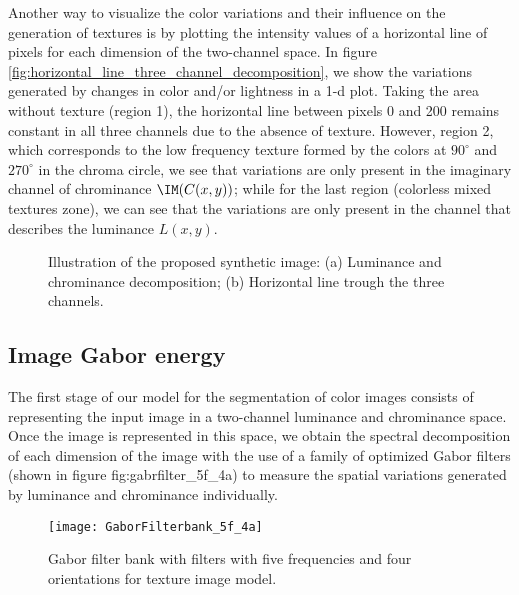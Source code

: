 Another way to visualize the color variations and their influence on the generation of textures is by plotting the intensity values of a horizontal line of pixels for each dimension of the two-channel space. In figure \ref{fig:horizontal_line_three_channel_decomposition}, we show the variations generated by changes in color and/or lightness in a 1-d plot. Taking the area without texture (region 1), the horizontal line between pixels 0 and 200 remains constant in all three channels due to the absence of texture. However, region 2, which corresponds to the low frequency texture formed by the colors at $90^\circ$ and $270^\circ$ in the chroma circle, we see that variations are only present in the imaginary channel of chrominance $\IM(C(x,y))$; while for the last region (colorless mixed textures zone), we can see that the variations are only present in the channel that describes the luminance $L(x,y)$.

\begin{figure}[!ht]
\centering
\caption{Illustration of the proposed synthetic image: (a) Luminance and chrominance decomposition; (b) Horizontal line trough the three channels.}\label{fig:three_channel_decomposition}
\end{figure}

\subsection{Image Gabor energy}
The first stage of our model for the segmentation of color images consists of representing the input image in a two-channel luminance and chrominance space. Once the image is represented in this space, we obtain the spectral decomposition of each dimension of the image with the use of a family of optimized Gabor filters (shown in figure {fig:gabrfilter_5f_4a}) to measure the spatial variations generated by luminance and chrominance individually.

\begin{figure}[!ht]
    \centering
    \texttt{[image: GaborFilterbank\_5f\_4a]}
    \caption{Gabor filter bank with filters with five frequencies and four orientations for texture image model.}\label{fig:gabrfilter_5f_4a}    
\end{figure}

